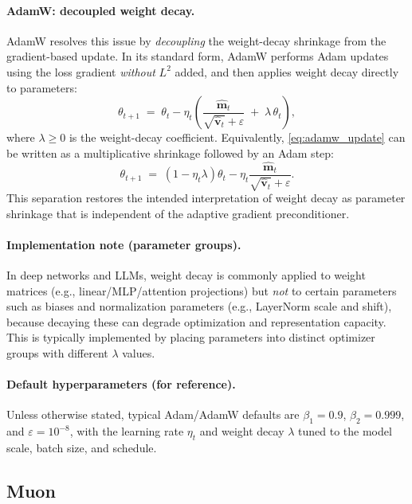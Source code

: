\paragraph{AdamW: decoupled weight decay.}
AdamW resolves this issue by \emph{decoupling} the weight-decay shrinkage from the gradient-based update. In its standard form, AdamW performs Adam updates using the loss gradient \emph{without} $L^2$ added, and then applies weight decay directly to parameters:
\begin{equation}
\theta_{t+1}
\;=\;
\theta_t
-
\eta_t\left(
\frac{\hat{\mathbf{m}}_t}{\sqrt{\hat{\mathbf{v}}_t}+\varepsilon}
\;+\;
\lambda\,\theta_t
\right),
\label{eq:adamw_update}
\end{equation}
where $\lambda\ge 0$ is the weight-decay coefficient. Equivalently, \eqref{eq:adamw_update} can be written as a multiplicative shrinkage followed by an Adam step:
\[
\theta_{t+1}
\;=\;
(1-\eta_t\lambda)\theta_t
-
\eta_t\frac{\hat{\mathbf{m}}_t}{\sqrt{\hat{\mathbf{v}}_t}+\varepsilon}.
\]
This separation restores the intended interpretation of weight decay as parameter shrinkage that is independent of the adaptive gradient preconditioner.

\paragraph{Implementation note (parameter groups).}
In deep networks and LLMs, weight decay is commonly applied to weight matrices (e.g., linear/MLP/attention projections) but \emph{not} to certain parameters such as biases and normalization parameters (e.g., LayerNorm scale and shift), because decaying these can degrade optimization and representation capacity. This is typically implemented by placing parameters into distinct optimizer groups with different $\lambda$ values.

\paragraph{Default hyperparameters (for reference).}
Unless otherwise stated, typical Adam/AdamW defaults are $\beta_1=0.9$, $\beta_2=0.999$, and $\varepsilon=10^{-8}$, with the learning rate $\eta_t$ and weight decay $\lambda$ tuned to the model scale, batch size, and schedule.

\subsection{Muon}


